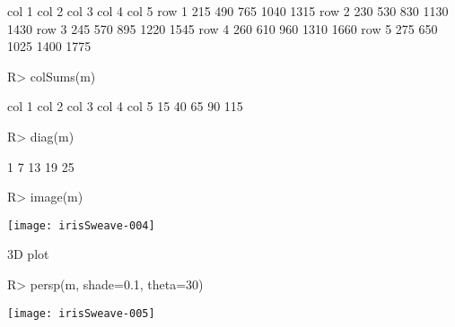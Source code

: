 \documentclass[fleqn, letter, 10pt]{article}
\begin{document}
\begin{Schunk}
\begin{Soutput}
      col 1 col 2 col 3 col 4 col 5
row 1   215   490   765  1040  1315
row 2   230   530   830  1130  1430
row 3   245   570   895  1220  1545
row 4   260   610   960  1310  1660
row 5   275   650  1025  1400  1775
\end{Soutput}
\begin{Sinput}
R> colSums(m)
\end{Sinput}
\begin{Soutput}
col 1 col 2 col 3 col 4 col 5 
   15    40    65    90   115 
\end{Soutput}
\begin{Sinput}
R> diag(m)
\end{Sinput}
\begin{Soutput}
[1]  1  7 13 19 25
\end{Soutput}
\end{Schunk}


\begin{Schunk}
\begin{Sinput}
R> image(m)
\end{Sinput}
\end{Schunk}
\texttt{[image: irisSweave-004]}

3D plot
\begin{Schunk}
\begin{Sinput}
R> persp(m, shade=0.1, theta=30)
\end{Sinput}
\end{Schunk}
\texttt{[image: irisSweave-005]}
\end{document}
